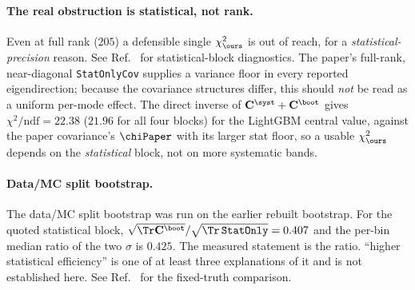 \paragraph{The real obstruction is statistical, not rank.} Even at full rank ($205$) a defensible single $\chi^{2}_{\ours}$ is out of reach, for a \emph{statistical-precision} reason. See Ref.~\cite{NoteRecords2026} for statistical-block diagnostics. The paper's full-rank, near-diagonal \texttt{StatOnlyCov} supplies a variance floor in every reported eigendirection; because the covariance structures differ, this should \emph{not} be read as a uniform per-mode effect. The direct inverse of $\mathbf{C}^{\syst}+\mathbf{C}^{\boot}$ gives $\chi^{2}/\mathrm{ndf}=22.38$ ($21.96$ for all four blocks) for the LightGBM central value, against the paper covariance's $\chiPaper$ with its larger stat floor, so a usable $\chi^{2}_{\ours}$ depends on the \emph{statistical} block, not on more systematic bands. 

\paragraph{Data/MC split bootstrap.} The data/MC split bootstrap was run on the earlier rebuilt bootstrap. For the quoted statistical block, $\sqrt{\Tr\mathbf{C}^{\boot}}/\sqrt{\Tr\,\texttt{StatOnly}}=0.407$ and the per-bin median ratio of the two $\sigma$ is $0.425$. The measured statement is the ratio. ``higher statistical efficiency'' is one of at least three explanations of it and is not established here. See Ref.~\cite{NoteRecords2026} for the fixed-truth comparison.


